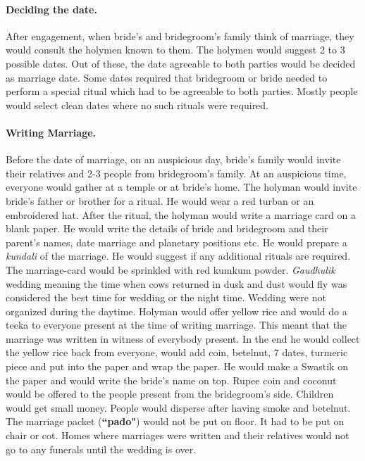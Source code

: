 \paragraph{Deciding the date.} After engagement, when bride's and bridegroom's family
think of marriage, they would consult the holymen known to them. The holymen
would suggest 2 to 3 possible dates. Out of these, the date agreeable to both
parties would be decided as marriage date. Some dates required that bridegroom or
bride needed to perform a special ritual which had to be agreeable to both
parties. Mostly people would select clean dates where no such rituals were
required. 

\paragraph{Writing Marriage.} Before the date of marriage, on an auspicious day,
bride's family would invite their relatives and 2-3 people from bridegroom's family.
At an auspicious time, everyone would gather at a temple or at bride's home.
The holyman would invite bride's father or brother for a ritual. He would wear a
red turban or an embroidered hat. After the ritual, the holyman would write a
marriage card on a blank paper. He would write the details of bride and bridegroom
and their parent's names, date marriage and planetary positions etc. He would
prepare a \textit{kundali} of the marriage. He would suggest if any additional
rituals are required. The marriage-card would be sprinkled with red kumkum
powder. \textit{Gaudhulik} wedding meaning the time when cows returned in dusk
and dust would fly was considered the best time for wedding or the night time.
Wedding were not organized during the daytime. Holyman would offer yellow rice
and would do a teeka to everyone present at the time of writing marriage. This
meant that the marriage was written in witness of everybody present. In the end
he would collect the yellow rice back from everyone, would add coin, betelnut,
7 dates, turmeric piece and put into the paper and wrap the paper. He would
make a Swastik on the paper and would write the bride's name on top. Rupee coin
and coconut would be offered to the people present from the bridegroom's side.
Children would get small money. People would disperse after having smoke and
betelnut. The marriage packet (\textbf{``pado"}) would not be put on floor. It
had to be put on chair or cot. Homes where marriages were written and their
relatives would not go to any funerals until the wedding is over.

